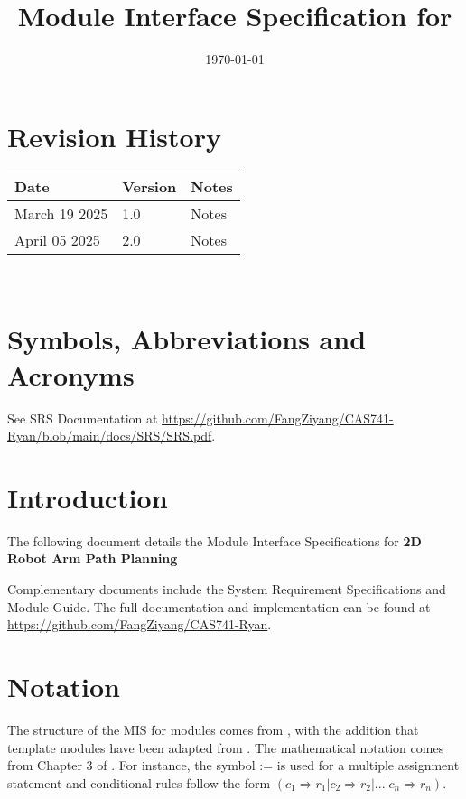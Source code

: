 \documentclass[12pt, titlepage]{article}
\begin{document}
\title{Module Interface Specification for \progname{}}

\author{\authname}

\date{\today}

\maketitle


\section{Revision History}

\begin{tabularx}{\textwidth}{p{3cm}p{2cm}X}
\toprule {\bf Date} & {\bf Version} & {\bf Notes}\\
\midrule
March 19 2025 & 1.0 & Notes\\
April 05 2025 & 2.0 & Notes\\
\bottomrule
\end{tabularx}

~\newpage

\section{Symbols, Abbreviations and Acronyms}

See SRS Documentation at \url{https://github.com/FangZiyang/CAS741-Ryan/blob/main/docs/SRS/SRS.pdf}.


\newpage

\tableofcontents

\newpage


\section{Introduction}


The following document details the Module Interface Specifications for
\textbf{2D Robot Arm Path Planning} 

Complementary documents include the System Requirement Specifications
and Module Guide.  The full documentation and implementation can be
found at \url{https://github.com/FangZiyang/CAS741-Ryan}. 




\section{Notation}
The structure of the MIS for modules comes from \citet{HoffmanAndStrooper1995},
with the addition that template modules have been adapted from
\cite{GhezziEtAl2003}.  The mathematical notation comes from Chapter 3 of
\citet{HoffmanAndStrooper1995}.  For instance, the symbol := is used for a
multiple assignment statement and conditional rules follow the form $(c_1
\Rightarrow r_1 | c_2 \Rightarrow r_2 | ... | c_n \Rightarrow r_n )$.
\end{document}
